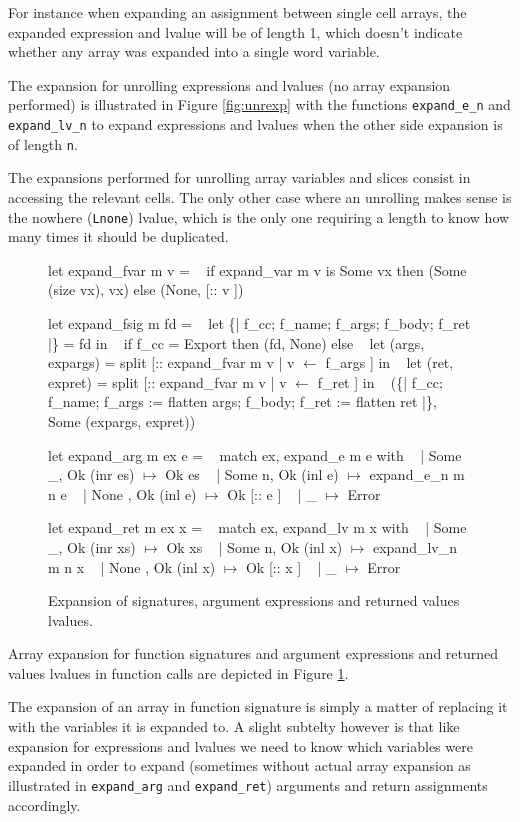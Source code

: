 \documentclass{article}
\begin{document}
For instance when expanding an assignment between single cell arrays, the
expanded expression and lvalue will be of length 1, which doesn't indicate
whether any array was expanded into a single word variable.

The expansion for unrolling expressions and lvalues (no array expansion
performed) is illustrated in Figure \ref{fig:unrexp} with the functions
\texttt{expand\_e\_n} and \texttt{expand\_lv\_n} to expand expressions and
lvalues when the other side expansion is of length \texttt{n}.

The expansions performed for unrolling array variables and slices consist in
accessing the relevant cells. The only other case where an unrolling makes sense
is the nowhere (\texttt{Lnone}) lvalue, which is the only one requiring a length
to know how many times it should be duplicated.

\medskip

\begin{figure}[t]
\obeylines\obeyspaces\ttfamily%
let expand\_fvar m v =
~ if expand\_var m v is Some vx then (Some (size vx), vx) else (None, [:: v ])

let expand\_fsig m fd =
~ let \{| f\_cc; f\_name; f\_args; f\_body; f\_ret |\} = fd in
~ if f\_cc = Export then (fd, None) else
~ let (args, expargs) = split [:: expand\_fvar m v | v \(\gets\) f\_args ] in
~ let (ret,  expret)  = split [:: expand\_fvar m v | v \(\gets\) f\_ret  ] in
~ (\{| f\_cc; f\_name; f\_args := flatten args; f\_body; f\_ret := flatten ret |\},
~   Some (expargs, expret))

let expand\_arg m ex e =
~ match ex, expand\_e m e with
~ | Some \_, Ok (inr es)  \(\mapsto\) Ok es
~ | Some n, Ok (inl e)   \(\mapsto\) expand\_e\_n m n e
~ | None  , Ok (inl e)   \(\mapsto\) Ok [:: e ]
~ | \_                    \(\mapsto\) Error

let expand\_ret m ex x =
~ match ex, expand\_lv m x with
~ | Some \_, Ok (inr xs)   \(\mapsto\) Ok xs
~ | Some n, Ok (inl x)    \(\mapsto\) expand\_lv\_n m n x
~ | None  , Ok (inl x)    \(\mapsto\) Ok [:: x ]
~ | \_                     \(\mapsto\) Error
\normalfont%
\caption{Expansion of signatures, argument expressions and returned values lvalues.}\label{fig:sigexp}
\end{figure}

Array expansion for function signatures and argument expressions and
returned values lvalues in function calls are depicted in Figure
\ref{fig:sigexp}.

The expansion of an array in function signature is simply a matter of replacing
it with the variables it is expanded to. A slight subtelty however is that like
expansion for expressions and lvalues we need to know which variables were
expanded in order to expand (sometimes without actual array expansion as
illustrated in \texttt{expand\_arg} and \texttt{expand\_ret}) arguments and
return assignments accordingly.
\end{document}
